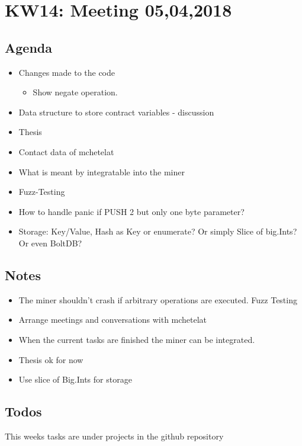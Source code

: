 \section{KW14: Meeting 05,04,2018}

\subsection{Agenda}

\begin{itemize}
\item
  Changes made to the code

  \begin{itemize}
  \item
    Show negate operation.
  \end{itemize}
\item
  Data structure to store contract variables - discussion
\item
  Thesis
\item
  Contact data of mchetelat
\item
  What is meant by integratable into the miner
\item
  Fuzz-Testing
\item
  How to handle panic if PUSH 2 but only one byte parameter?
\item
  Storage: Key/Value, Hash as Key or enumerate? Or simply Slice of
  big.Ints? Or even BoltDB?
\end{itemize}

\subsection{Notes}
\begin{itemize}
\item
  The miner shouldn't crash if arbitrary operations are executed. Fuzz
  Testing
\item
  Arrange meetings and conversations with mchetelat
\item
  When the current tasks are finished the miner can be integrated.
\item
  Thesis ok for now
\item
  Use slice of Big.Ints for storage
\end{itemize}

\subsection{Todos}
This weeks tasks are under projects in the github repository

